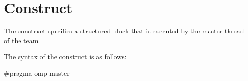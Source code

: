 %
%
%
%
%
%
%
%
%
%
%
%
%

\section{ Construct}
\label{sec:master}
\summary
The  construct specifies a structured block that is executed by 
the master thread of the team.

\syntax
\begin{ccppspecific}
The syntax of the  construct is as follows:

\begin{ompcPragma}
#pragma omp master 
\end{ompcPragma}
\end{ccppspecific}

